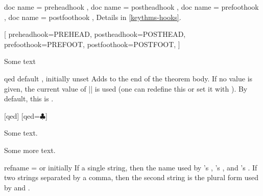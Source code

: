 \documentclass{ltxdoc}
\makeatletter
\newcommand{\TCBkeydescnewline@aux}{ %
  \xpatchcmd{\__tcobox_doc_head_key:}
    {( \tl_use:N \g__tcobox_doc_description_tl}
    {\\[1ex] ( \tl_use:N \g__tcobox_doc_description_tl}
    {}{}
  }
\newcommand{\TCBkeydescnewline}{\ExplSyntaxOn\TCBkeydescnewline@aux\ExplSyntaxOff}
\makeatother
\begin{document}
\begin{docKeys}[
  doc parameter = {=\meta{code}},
  doc description = initially unset,
  ]
  {
    { doc name = preheadhook },
    { doc name = postheadhook },
    { doc name = prefoothook },
    { doc name = postfoothook },
  }
Details in \autoref{keythms-hooks}.

\begin{codepreamble}
[
  preheadhook=PREHEAD,
  postheadhook=POSTHEAD,
  prefoothook=PREFOOT,
  postfoothook=POSTFOOT,
  ]
\end{codepreamble}

\begin{keythmscode}[withpreamble]
\begin{test}
Some text
\end{test}
\end{keythmscode}

\end{docKeys}

\begin{docKey}{qed}
  {}
  {default , initially unset}
Adds  to the end of the theorem body.
If no value is given, the current value of |\qedsymbol| is used (one can redefine this or set it with ).
By default, this is \qedsymbol.

\begin{codepreamble}
[qed]
[qed=$\clubsuit$]
\end{codepreamble}

\begin{keythmscode}[withpreamble]
\begin{example}
Some text.
\end{example}
\begin{solution}
Some more text.
\end{solution}
\end{keythmscode}

\end{docKey}

\begin{docKey}[][before upper=\TCBkeydescnewline]{refname}
  {= \textrm{or} }
  {initially  }
If a single string, then the name used by 's , 's , and 's .
If two strings separated by a comma, then the second string is the plural form used by  and .
\end{docKey}
\end{document}
